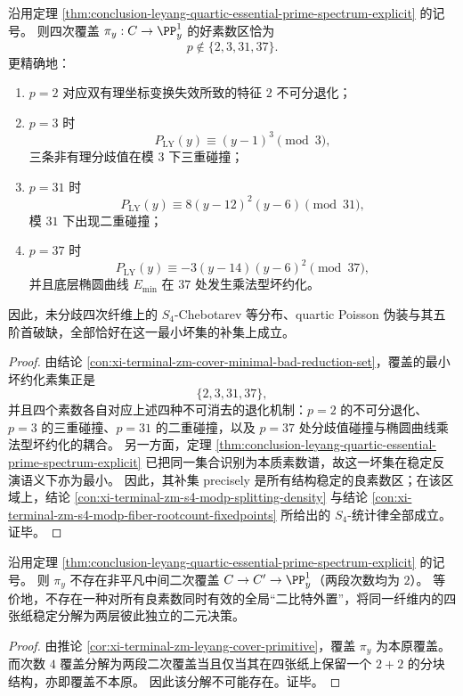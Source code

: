 \begin{theorem}\label{thm:conclusion-leyang-quartic-minimal-bad-reduction-prime-wall}
沿用定理 \ref{thm:conclusion-leyang-quartic-essential-prime-spectrum-explicit} 的记号。
则四次覆盖 \(\pi_y:C\to \PP^1_y\) 的好素数区恰为
\[
p\notin \{2,3,31,37\}.
\]
更精确地：
\begin{enumerate}
\item \(p=2\) 对应双有理坐标变换失效所致的特征 \(2\) 不可分退化；
\item \(p=3\) 时
\[
P_{\mathrm{LY}}(y)\equiv (y-1)^3 \pmod 3,
\]
三条非有理分歧值在模 \(3\) 下三重碰撞；
\item \(p=31\) 时
\[
P_{\mathrm{LY}}(y)\equiv 8(y-12)^2(y-6)\pmod{31},
\]
模 \(31\) 下出现二重碰撞；
\item \(p=37\) 时
\[
P_{\mathrm{LY}}(y)\equiv -3(y-14)(y-6)^2\pmod{37},
\]
并且底层椭圆曲线 \(E_{\min}\) 在 \(37\) 处发生乘法型坏约化。
\end{enumerate}
因此，未分歧四次纤维上的 \(S_4\)-Chebotarev 等分布、quartic Poisson 伪装与其五阶首破缺，全部恰好在这一最小坏集的补集上成立。
\end{theorem}
\begin{proof}
由结论 \ref{con:xi-terminal-zm-cover-minimal-bad-reduction-set}，覆盖的最小坏约化素集正是
\[
\{2,3,31,37\},
\]
并且四个素数各自对应上述四种不可消去的退化机制：\(p=2\) 的不可分退化、\(p=3\) 的三重碰撞、\(p=31\) 的二重碰撞，以及 \(p=37\) 处分歧值碰撞与椭圆曲线乘法型坏约化的耦合。
另一方面，定理 \ref{thm:conclusion-leyang-quartic-essential-prime-spectrum-explicit} 已把同一集合识别为本质素数谱，故这一坏集在稳定反演语义下亦为最小。
因此，其补集 precisely 是所有结构稳定的良素数区；在该区域上，结论 \ref{con:xi-terminal-zm-s4-modp-splitting-density} 与结论 \ref{con:xi-terminal-zm-s4-modp-fiber-rootcount-fixedpoints} 所给出的 \(S_4\)-统计律全部成立。证毕。
\end{proof}

\begin{proposition}\label{prop:conclusion-leyang-no-global-quadratic-quadratic-factorization}
沿用定理 \ref{thm:conclusion-leyang-quartic-essential-prime-spectrum-explicit} 的记号。
则 \(\pi_y\) 不存在非平凡中间二次覆盖 \(C\to C'\to\PP^1_y\)（两段次数均为 \(2\)）。
等价地，不存在一种对所有良素数同时有效的全局“二比特外置”，将同一纤维内的四张纸稳定分解为两层彼此独立的二元决策。
\end{proposition}
\begin{proof}
由推论 \ref{cor:xi-terminal-zm-leyang-cover-primitive}，覆盖 \(\pi_y\) 为本原覆盖。
而次数 \(4\) 覆盖分解为两段二次覆盖当且仅当其在四张纸上保留一个 \(2+2\) 的分块结构，亦即覆盖不本原。
因此该分解不可能存在。证毕。
\end{proof}

\endinput
